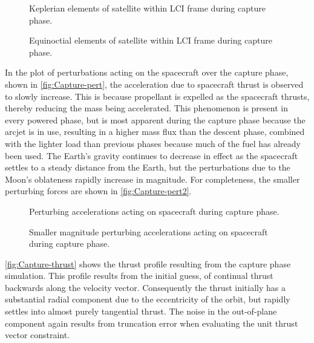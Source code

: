 \begin{figure}
\centering
\def\svgwidth{\figurewidth}

\caption{Keplerian elements of satellite within LCI frame during capture phase.} \label{fig:Capture-kep-lci}
\end{figure}

\begin{figure}
\centering
\def\svgwidth{\figurewidth}

\caption{Equinoctial elements of satellite within LCI frame during capture phase.} \label{fig:Capture-mee}
\end{figure}

In the plot of perturbations acting on the spacecraft over the capture phase, shown in \autoref{fig:Capture-pert}, the acceleration due to spacecraft thrust is observed to slowly increase. This is because propellant is expelled as the spacecraft thrusts, thereby reducing the mass being accelerated. This phenomenon is present in every powered phase, but is most apparent during the capture phase because the arcjet is in use, resulting in a higher mass flux than the descent phase, combined with the lighter load than previous phases because much of the fuel has already been used. The Earth's gravity continues to decrease in effect as the spacecraft settles to a steady distance from the Earth, but the perturbations due to the Moon's oblateness rapidly increase in magnitude. For completeness, the smaller perturbing forces are shown in \autoref{fig:Capture-pert2}.

\begin{subfigures}
\begin{figure}
\centering
\def\svgwidth{\figurewidth}

\caption{Perturbing accelerations acting on spacecraft during capture phase.} \label{fig:Capture-pert}
\end{figure}

\begin{figure}
\centering
\def\svgwidth{\figurewidth}

\caption{Smaller magnitude perturbing accelerations acting on spacecraft during capture phase.} \label{fig:Capture-pert2}
\end{figure}
\end{subfigures}

\autoref{fig:Capture-thrust} shows the thrust profile resulting from the capture phase simulation. This profile results from the initial guess, of continual thrust backwards along the velocity vector. Consequently the thrust initially has a substantial radial component due to the eccentricity of the orbit, but rapidly settles into almost purely tangential thrust. The noise in the out-of-plane component again results from truncation error when evaluating the unit thrust vector constraint.

